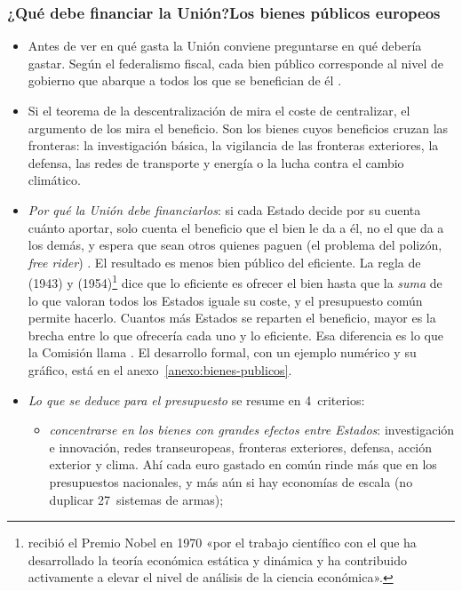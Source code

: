 \documentclass[11pt]{article}
\begin{document}
\subsubsection{¿Qué debe financiar la Unión?\cortetitulo Los bienes públicos europeos}\label{sec:bienes-publicos}

\begin{itemize}
\item Antes de ver en qué gasta la Unión conviene preguntarse en qué debería gastar. Según el federalismo fiscal, cada bien público corresponde al nivel de gobierno que abarque a todos los que se benefician de él .
\item Si el teorema de la descentralización de  mira el coste de centralizar, el argumento de los  mira el beneficio. Son los bienes cuyos beneficios cruzan las fronteras: la investigación básica, la vigilancia de las fronteras exteriores, la defensa, las redes de transporte y energía o la lucha contra el cambio climático.
\item \emph{Por qué la Unión debe financiarlos}: si cada Estado decide por su cuenta cuánto aportar, solo cuenta el beneficio que el bien le da a él, no el que da a los demás, y espera que sean otros quienes paguen (el problema del polizón, \emph{free rider}) . El resultado es menos bien público del eficiente. La regla de  (1943) y  (1954)\nocite{Bowen1943Interpretation,Samuelson1954Pure}\footnote{ recibió el Premio Nobel en 1970 «por el trabajo científico con el que ha desarrollado la teoría económica estática y dinámica y ha contribuido activamente a elevar el nivel de análisis de la ciencia económica»\nocite{Nobel1970Samuelson}.} dice que lo eficiente es ofrecer el bien hasta que la \emph{suma} de lo que valoran todos los Estados iguale su coste, y el presupuesto común permite hacerlo. Cuantos más Estados se reparten el beneficio, mayor es la brecha entre lo que ofrecería cada uno y lo eficiente. Esa diferencia es lo que la Comisión llama . El desarrollo formal, con un ejemplo numérico y su gráfico, está en el anexo~\ref{anexo:bienes-publicos}.
\item \emph{Lo que se deduce para el presupuesto} se resume en 4~criterios:
  \begin{itemize}
  \item \emph{concentrarse en los bienes con grandes efectos entre Estados}: investigación e innovación, redes transeuropeas, fronteras exteriores, defensa, acción exterior y clima. Ahí cada euro gastado en común rinde más que en los presupuestos nacionales, y más aún si hay economías de escala (no duplicar 27~sistemas de armas);

\end{itemize}
\end{itemize}
\end{document}
